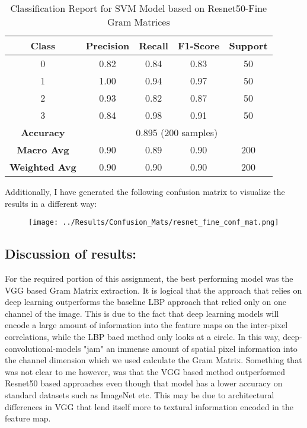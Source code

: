 \documentclass{article}
\begin{document}
\begin{table}[h!]
    \centering
    \begin{tabular}{|c|c|c|c|c|}
        \hline
        Class & Precision & Recall & F1-Score & Support \\
        \hline
        0 & 0.82 & 0.84 & 0.83 & 50 \\
        1 & 1.00 & 0.94 & 0.97 & 50 \\
        2 & 0.93 & 0.82 & 0.87 & 50 \\
        3 & 0.84 & 0.98 & 0.91 & 50 \\
        \hline
        \multicolumn{1}{|c|}{\textbf{Accuracy}} & \multicolumn{4}{c|}{0.895 (200 samples)} \\
        \hline
        \multicolumn{1}{|c|}{\textbf{Macro Avg}} & 0.90 & 0.89 & 0.90 & 200 \\
        \multicolumn{1}{|c|}{\textbf{Weighted Avg}} & 0.90 & 0.90 & 0.90 & 200 \\
        \hline
    \end{tabular}
    \caption{Classification Report for SVM Model based on Resnet50-Fine Gram Matrices}
    \label{tab:classification_report-resnet-fine}
\end{table}


Additionally, I have generated the following confusion matrix to visualize the results in a different way:

\begin{figure}[H]
    \centering
    \texttt{[image: ../Results/Confusion\_Mats/resnet\_fine\_conf\_mat.png]}
    \label{fig:resnet-fine-conf-mat}
\end{figure}

\subsection{Discussion of results: }
For the required portion of this assignment, the best performing model was the VGG based Gram Matrix extraction. It is logical that the approach that relies on deep learning outperforms the baseline LBP approach that relied only on one channel of the image. This is due to the fact that deep learning models will encode a large amount of information into the feature maps on the inter-pixel correlations, while the LBP baed method only looks at a circle. In this way, deep-convolutional-models "jam" an immense amount of spatial pixel information into the channel dimension which we used calculate the Gram Matrix. Something that was not clear to me however, was that the VGG based method outperformed Resnet50 based approaches even though that model has a lower accuracy on standard datasets such as ImageNet etc. This may be due to architectural differences in VGG that lend itself more to textural information encoded in the feature map.
\end{document}
